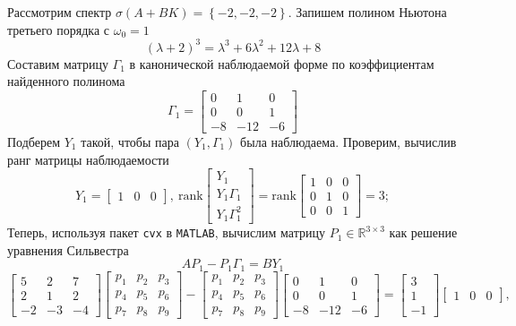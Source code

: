 \documentclass[a4paper, 12pt]{article}
\begin{document}
    Рассмотрим спектр $\sigma\left(A+BK\right)=\left\{-2,-2,-2\right\}$. Запишем полином
    Ньютона третьего порядка с $\omega_0=1$
    $$
    \left(\lambda+2\right)^3=\lambda^3+6\lambda^2+12\lambda+8
    $$
    Составим матрицу $\Gamma_1$ в канонической наблюдаемой форме по коэффициентам найденного полинома
    $$
\Gamma_1=\begin{bmatrix}
    0 &1 &0\\
    0 &0 &1\\
    -8 &-12 &-6
\end{bmatrix}
    $$
    Подберем $Y_1$ такой, чтобы пара $\left(Y_1,\Gamma_1\right)$ была наблюдаема. Проверим, вычислив ранг
    матрицы наблюдаемости
    $$
    Y_1=\begin{bmatrix}
        1 &0 &0
    \end{bmatrix},\ \text{rank}\begin{bmatrix}
        Y_1\\ Y_1\Gamma_1\\ Y_1\Gamma_1^2
    \end{bmatrix}=\text{rank}\begin{bmatrix}
    1     &0     &0\\
     0     &1     &0\\
     0     &0     &1
    \end{bmatrix}=3;
    $$
    Теперь, используя пакет \texttt{cvx} в \texttt{MATLAB}, вычислим матрицу $P_1\in\mathbb{R}^{3\times3}$
    как решение уравнения Сильвестра
    $$AP_1-P_1\Gamma_1=BY_1$$
    $$\begin{bmatrix}
        5 &2 &7\\
        2 &1 &2\\
        -2 &-3 &-4
    \end{bmatrix}\begin{bmatrix}
        p_1 &p_2 &p_3\\
        p_4 &p_5 &p_6\\
        p_7 &p_8 &p_9
    \end{bmatrix}-\begin{bmatrix}
        p_1 &p_2 &p_3\\
        p_4 &p_5 &p_6\\
        p_7 &p_8 &p_9
    \end{bmatrix}\begin{bmatrix}
        0 &1 &0\\
        0 &0 &1\\
        -8 &-12 &-6
    \end{bmatrix}=\begin{bmatrix}
        3\\
        1\\
        -1
    \end{bmatrix}\begin{bmatrix}
        1 &0 &0
    \end{bmatrix},$$
\end{document}
